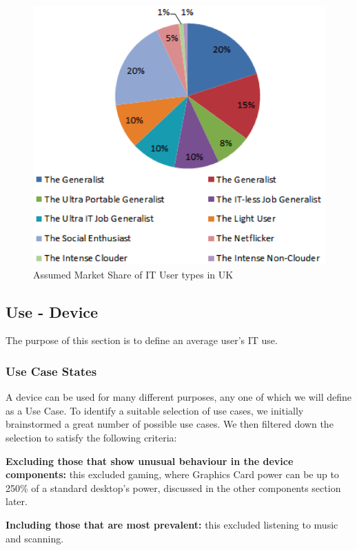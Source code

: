 \documentclass[conference]{IEEEtran}
\begin{document}
\begin{figure}[!ht]
\centering
\includegraphics[width=\columnwidth]{images/ukitusers_marketshare.png}
\caption{Assumed Market Share of IT User types in UK}
\label{fig:marketshare} 
\end{figure}


\subsection{Use - Device}

The purpose of this section is to define an average user’s IT use.

\subsubsection{Use Case States}

A device can be used for many different purposes, any one of which we will define as a Use Case.
To identify a suitable selection of use cases, we initially
brainstormed a great number of possible use cases. We then filtered
down the selection to satisfy the following criteria:

{\textbf{Excluding those that show unusual behaviour in the device
    components:}} this excluded gaming, where Graphics Card power can be up to 250\% of
a standard desktop’s power, discussed in the other components section
later.

{\textbf{Including those that are most prevalent:}} this excluded listening to
music and scanning.
\end{document}
